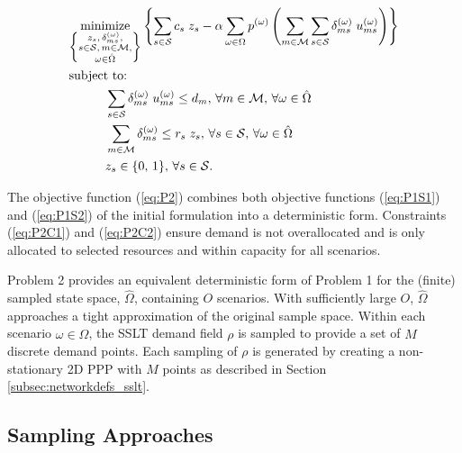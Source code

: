 \documentclass[12pt,dvipsnames]{report}
\begin{document}
\vspace{3mm}
\begin{tcolorbox}[title = Problem 2 (Deterministic Equivalent Program of Problem 1)]
\begin{align}
& \underset{\left\{ \substack{
	z_s,\, \delta_{ms}^{(\omega)},\\
	s \in \mathcal{S},\, m \in \mathcal{M},\\
	\omega \in \hat{\Omega}} \right\}} {\text{minimize}}
\left\{ \sum_{s \in \mathcal{S}} c_s \; z_s - \alpha \sum_{\omega \in \Omega} p^{(\omega)} \left( \sum_{m \in \mathcal{M}} \sum_{s \in \mathcal{S}} \delta_{ms}^{(\omega)} \; u_{ms}^{(\omega)} \right) \right\} \label{eq:P2}\\
& \text{subject to:}  \nonumber \\
& \hspace{0.4in} \sum_{s \in \mathcal{S}} \delta_{ms}^{(\omega)} \; u_{ms}^{(\omega)} \leq d_m,\, \forall m \in \mathcal{M},\, \forall \omega \in \hat{\Omega} \label{eq:P2C1}\\
& \hspace{0.4in} \sum_{m \in \mathcal{M}} \delta_{ms}^{(\omega)} \leq r_s \; z_s,\, \forall s \in \mathcal{S},\, \forall \omega \in \hat{\Omega} \label{eq:P2C2}\\
& \hspace{0.4in} z_s \in \{0,\, 1\},\, \forall s \in \mathcal{S}. \label{eq:P2C3}
\end{align}
\end{tcolorbox}

The objective function (\ref{eq:P2}) combines both objective functions (\ref{eq:P1S1}) and (\ref{eq:P1S2}) of the initial formulation into a deterministic form.  Constraints (\ref{eq:P2C1}) and (\ref{eq:P2C2})	ensure demand is not overallocated and is only allocated to selected resources and within capacity for all scenarios.

Problem 2 provides an equivalent deterministic form of Problem 1 for the (finite) sampled state space, $\hat{\Omega}$, containing $O$ scenarios.  With sufficiently large $O$, $\hat{\Omega}$ approaches a tight approximation of the original sample space.  Within each scenario $\omega \in \hat{\Omega}$, the SSLT demand field $\rho$ is sampled to provide a set of $M$ discrete demand points.  Each sampling of $\rho$ is generated by creating a non-stationary 2D PPP with $M$ points as described in Section \ref{subsec:networkdefs_sslt}.

\subsection{Sampling Approaches} \label{subsec:dep_sampling}
\end{document}

